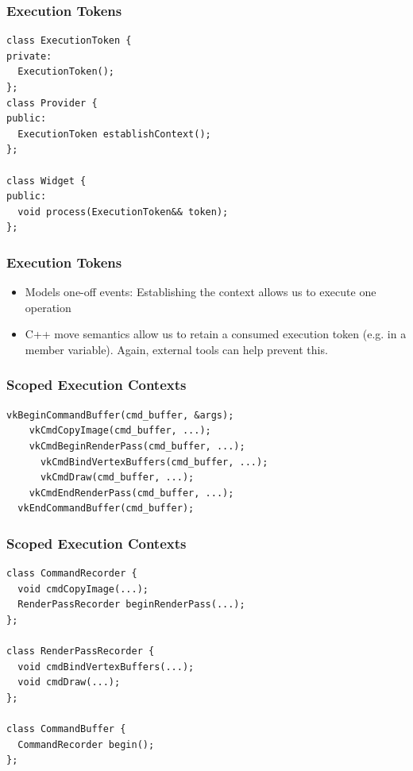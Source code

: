 \documentclass[aspectratio=169]{beamer}
\begin{document}
\begin{frame}[fragile]
  \frametitle{Execution Tokens}
  
  \begin{lstlisting}[style=cpp20]
class ExecutionToken {
private:
  ExecutionToken();
};
class Provider {
public:
  ExecutionToken establishContext();
};

class Widget {
public:
  void process(ExecutionToken&& token);
};
  \end{lstlisting}
\end{frame}

\begin{frame}
  \frametitle{Execution Tokens}
  \begin{itemize}
    \item Models one-off events: Establishing the context allows us to execute one operation
    \item C++ move semantics allow us to retain a consumed execution token (e.g. in a member variable). Again, external tools can help prevent this.
  \end{itemize}
\end{frame}

\begin{frame}[fragile]
  \frametitle{Scoped Execution Contexts}
  
  \begin{lstlisting}[style=cpp20]
  vkBeginCommandBuffer(cmd_buffer, &args);
    vkCmdCopyImage(cmd_buffer, ...);
    vkCmdBeginRenderPass(cmd_buffer, ...);
      vkCmdBindVertexBuffers(cmd_buffer, ...);
      vkCmdDraw(cmd_buffer, ...);
    vkCmdEndRenderPass(cmd_buffer, ...);
  vkEndCommandBuffer(cmd_buffer);
  \end{lstlisting}
\end{frame}

\begin{frame}[fragile]
  \frametitle{Scoped Execution Contexts}
  
  \begin{lstlisting}[style=cpp20]
class CommandRecorder {
  void cmdCopyImage(...);
  RenderPassRecorder beginRenderPass(...);
};

class RenderPassRecorder {
  void cmdBindVertexBuffers(...);
  void cmdDraw(...);
};

class CommandBuffer {
  CommandRecorder begin();
};
  \end{lstlisting}
\end{frame}
\end{document}
